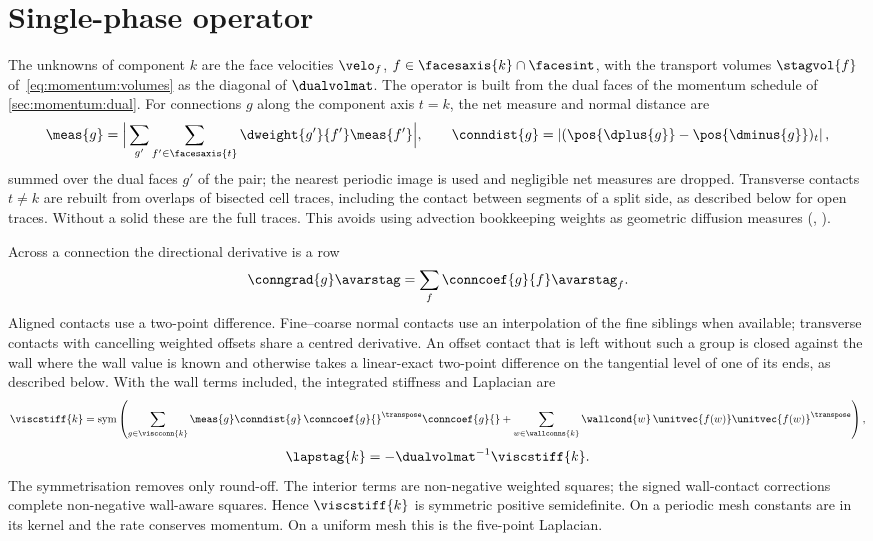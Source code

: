 \section{Single-phase operator}\label{sec:viscosity:single}
The unknowns of component $k$ are the face velocities $\velo_f$,
$f\in\facesaxis{k}\cap\facesint$, with the transport volumes $\stagvol{f}$
of~\cref{eq:momentum:volumes} as the diagonal of $\dualvolmat$. The
operator is built from the dual faces of the momentum schedule of
\cref{sec:momentum:dual}. For connections $g$ along the component axis $t=k$,
the net measure and normal distance are
\begin{equation}\label{eq:viscosity:connections}
  \meas{g}=\Big|\sum_{g'}\sum_{f'\in\facesaxis{t}}\dweight{g'}{f'}\meas{f'}\Big|,
  \qquad
  \conndist{g}=\abs{(\pos{\dplus{g}}-\pos{\dminus{g}})_t},
\end{equation}
summed over the dual faces $g'$ of the pair; the nearest periodic image is
used and negligible net measures are dropped. Transverse contacts $t\ne k$
are rebuilt from overlaps of bisected cell traces, including the contact
between segments of a split side, as described below for open traces. Without
a solid these are the full traces. This avoids using advection bookkeeping
weights as geometric diffusion measures (, ).

Across a connection the directional derivative is a row
\begin{equation}\label{eq:viscosity:gradient}
  \conngrad{g}\avarstag=\sum_f\conncoef{g}{f}\avarstag_f .
\end{equation}
Aligned contacts use a two-point difference. Fine--coarse normal contacts use
an interpolation of the fine siblings when available; transverse contacts
with cancelling weighted offsets share a centred derivative. An offset contact
that is left without such a group is closed against the wall where the wall
value is known and otherwise takes a linear-exact two-point difference on the
tangential level of one of its ends, as described below. With the
wall terms included, the integrated stiffness and Laplacian are
\begin{equation}\label{eq:viscosity:stiffness}
  \viscstiff{k}=\sym{\sum_{g\in\viscconn{k}}\meas{g}\conndist{g}\,
    \conncoef{g}{}^{\transpose}\conncoef{g}{}
    +\sum_{w\in\wallconns{k}}\wallcond{w}\,
      \unitvec{f(w)}\unitvec{f(w)}^{\transpose}},
\end{equation}
\begin{equation}\label{eq:viscosity:laplacian}
  \lapstag{k}=-\dualvolmat^{-1}\viscstiff{k}.
\end{equation}
The symmetrisation removes only round-off. The interior terms are non-negative
weighted squares; the signed wall-contact corrections complete non-negative
wall-aware squares. Hence $\viscstiff{k}$ is symmetric positive semidefinite.
On a periodic mesh constants are in its kernel and the rate conserves
momentum. On a uniform mesh this is the five-point Laplacian.

